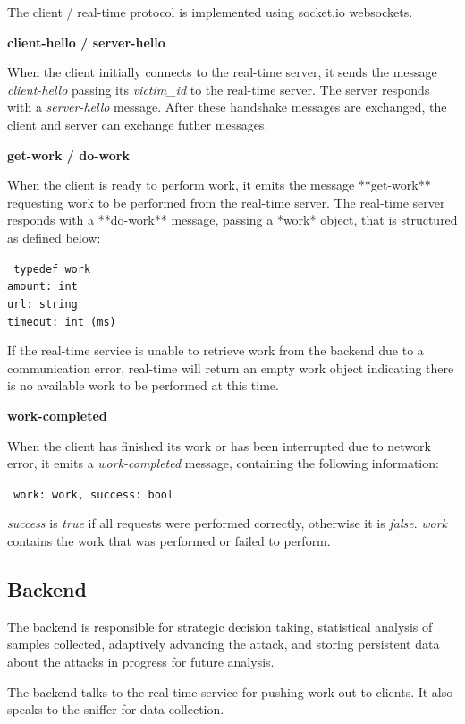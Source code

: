The client / real-time protocol is implemented using socket.io websockets.

 \textbf{client-hello / server-hello}

When the client initially connects to the real-time server, it sends the message
\textit{client-hello} passing its \textit{victim\_id} to the real-time server.  The server
responds with a \textit{server-hello} message. After these handshake messages are
exchanged, the client and server can exchange futher messages.

 \textbf{get-work / do-work}

When the client is ready to perform work, it emits the message **get-work**
requesting work to be performed from the real-time server. The real-time server
responds with a **do-work** message, passing a *work* object, that is
structured as defined below:

\texttt{
typedef work \\
  amount: int \\
  url: string \\
  timeout: int (ms) \\
}

If the real-time service is unable to retrieve work from the backend due to a
communication error, real-time will return an empty work object indicating
there is no available work to be performed at this time.

 \textbf{work-completed}

When the client has finished its work or has been interrupted due to network
error, it emits a \textit{work-completed} message, containing the following
information:

\texttt
{
  work: work,
  success: bool
}


\textit{success} is \textit{true} if all requests were performed correctly, otherwise it
is \textit{false}. \textit{work} contains the work that was performed or failed to perform.

\subsection{Backend}

The backend is responsible for strategic decision taking, statistical analysis
of samples collected, adaptively advancing the attack, and storing persistent
data about the attacks in progress for future analysis.

The backend talks to the real-time service for pushing work out to clients. It
also speaks to the sniffer for data collection.

